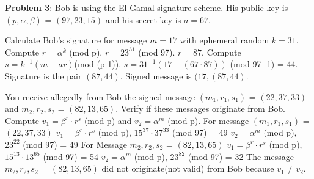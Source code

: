 \documentclass[12pt,letterpaper,final]{report}
\begin{document}
\bigskip

\noindent\textbf{Problem 3}: Bob is using the El Gamal signature scheme. His public key is $(p, \alpha, \beta)$ = $(97, 23, 15)$ and his secret key is $a = 67$.
\begin{alphlist}
	\item\indent Calculate Bob's signature for message $m = 17$ with ephemeral random $k = 31$.
	\newline
	 Compute $r = \alpha^{k}$ (mod p). $r = 23^{31}$ (mod 97). $ r = 87$.
	\newline\indent Compute $s = k^{-1}(m - ar)$(mod (p-1)). $s = 31^{-1}(17 - (67\cdot87))$ (mod 97 -1) = 44.
	\newline Signature is the pair $(87,44)$. Signed message is $( 17, (87, 44)$.
	\item\indent You receive allegedly from Bob the signed message $(m_{1}, r_{1}, s_{1})$ = $(22, 37, 33)$ and $m_{2}, r_{2}, s_{2}$ = $(82, 13, 65)$. Verify if these messages originate from Bob.
	\newline{} Compute $v_{1} = \beta^{r} \cdot r^{s}$ (mod p) and $v_{2} = \alpha^{m}$ (mod p).
	\newline For message $(m_{1}, r_{1}, s_{1})$ = $(22, 37, 33)$
	\newline $v_{1} = \beta^{r} \cdot r^{s}$ (mod p), $15^{37} \cdot 37^{33}$ (mod 97) = 49
	\newline $v_{2} = \alpha^{m}$ (mod p), $23^{22}$ (mod 97) = 49
	\newline For Message $m_{2}, r_{2}, s_{2}$ = $(82, 13, 65)$
	\newline $v_{1} = \beta^{r} \cdot r^{s}$ (mod p), $15^{13} \cdot 13^{65}$ (mod 97) = 54
	\newline $v_{2} = \alpha^{m}$ (mod p), $23^{82}$ (mod 97) = 32
	\newline The message  $m_{2}, r_{2}, s_{2}$ = $(82, 13, 65)$ did not originate(not valid) from Bob because $v_{1} \neq v_{2}$.
	\end{alphlist}
\end{document}
